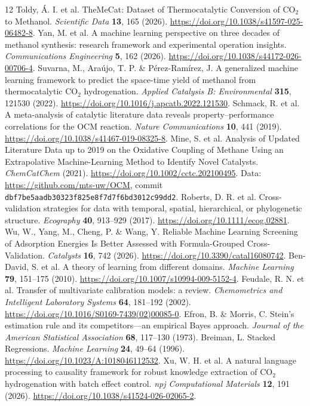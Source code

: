 \begin{thebibliography}{12}\small
{} Toldy, \'A. I. et al. TheMeCat: Dataset of Thermocatalytic Conversion of CO$_2$ to Methanol. \emph{Scientific Data} \textbf{13}, 165 (2026). \url{https://doi.org/10.1038/s41597-025-06482-8}.
 Yan, M. et al. A machine learning perspective on three decades of methanol synthesis: research framework and experimental operation insights. \emph{Communications Engineering} \textbf{5}, 162 (2026). \url{https://doi.org/10.1038/s44172-026-00706-4}.
 Suvarna, M., Ara\'ujo, T. P. \& P\'erez-Ram\'irez, J. A generalized machine learning framework to predict the space-time yield of methanol from thermocatalytic CO$_2$ hydrogenation. \emph{Applied Catalysis B: Environmental} \textbf{315}, 121530 (2022). \url{https://doi.org/10.1016/j.apcatb.2022.121530}.
 Schmack, R. et al. A meta-analysis of catalytic literature data reveals property--performance correlations for the OCM reaction. \emph{Nature Communications} \textbf{10}, 441 (2019). \url{https://doi.org/10.1038/s41467-019-08325-8}.
 Mine, S. et al. Analysis of Updated Literature Data up to 2019 on the Oxidative Coupling of Methane Using an Extrapolative Machine-Learning Method to Identify Novel Catalysts. \emph{ChemCatChem} (2021). \url{https://doi.org/10.1002/cctc.202100495}. Data: \url{https://github.com/mts-uw/OCM}, commit \texttt{dbf7be5aadb30323f825e8f7d7f6bd3012c99dd2}.
 Roberts, D. R. et al. Cross-validation strategies for data with temporal, spatial, hierarchical, or phylogenetic structure. \emph{Ecography} \textbf{40}, 913--929 (2017). \url{https://doi.org/10.1111/ecog.02881}.
 Wu, W., Yang, M., Cheng, P. \& Wang, Y. Reliable Machine Learning Screening of Adsorption Energies Is Better Assessed with Formula-Grouped Cross-Validation. \emph{Catalysts} \textbf{16}, 742 (2026). \url{https://doi.org/10.3390/catal16080742}.
 Ben-David, S. et al. A theory of learning from different domains. \emph{Machine Learning} \textbf{79}, 151--175 (2010). \url{https://doi.org/10.1007/s10994-009-5152-4}.
 Feudale, R. N. et al. Transfer of multivariate calibration models: a review. \emph{Chemometrics and Intelligent Laboratory Systems} \textbf{64}, 181--192 (2002). \url{https://doi.org/10.1016/S0169-7439(02)00085-0}.
 Efron, B. \& Morris, C. Stein's estimation rule and its competitors---an empirical Bayes approach. \emph{Journal of the American Statistical Association} \textbf{68}, 117--130 (1973).
 Breiman, L. Stacked Regressions. \emph{Machine Learning} \textbf{24}, 49--64 (1996). \url{https://doi.org/10.1023/A:1018046112532}.
 Xu, W. H. et al. A natural language processing to causality framework for robust knowledge extraction of CO$_2$ hydrogenation with batch effect control. \emph{npj Computational Materials} \textbf{12}, 191 (2026). \url{https://doi.org/10.1038/s41524-026-02065-2}.


\end{thebibliography}
